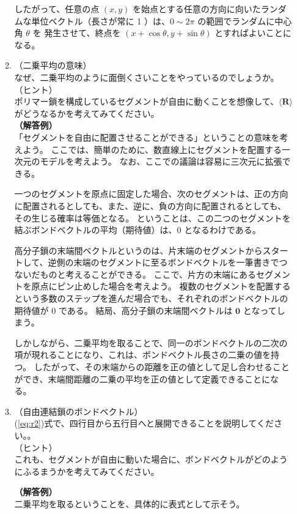 \documentclass[11pt]{jsarticle}
\begin{document}
\begin{itemize}
\begin{enumerate}
	したがって、任意の点 $(x,y)$ を始点とする任意の方向に向いたランダムな単位ベクトル（長さが常に 1 ）は、$0 \sim 2\pi$ の範囲でランダムに中心角 $\theta$ を
	発生させて、終点を $(x+\cos \theta, y+\sin \theta)$ とすればよいことになる。


	\item
	（二乗平均の意味）\\
	なぜ、二乗平均のように面倒くさいことをやっているのでしょうか。\\
	（ヒント）\\
	ポリマー鎖を構成しているセグメントが自由に動くことを想像して、$\langle \bm{R} \rangle$ がどうなるかを考えてみてください。\\
	{\bf（解答例）}\\
	「セグメントを自由に配置させることができる」ということの意味を考えよう。
	ここでは、簡単のために、数直線上にセグメントを配置する一次元のモデルを考えよう。
	なお、ここでの議論は容易に三次元に拡張できる。

	一つのセグメントを原点に固定した場合、次のセグメントは、正の方向に配置されるとしても、また、逆に、負の方向に配置されるとしても、その生じる確率は等価となる。
	ということは、この二つのセグメントを結ぶボンドベクトルの平均（期待値）は、0 となるわけである。

	高分子鎖の末端間ベクトルというのは、片末端のセグメントからスタートして、逆側の末端のセグメントに至るボンドベクトルを一筆書きでつないだものと考えることができる。
	ここで、片方の末端にあるセグメントを原点にピン止めした場合を考えよう。
	複数のセグメントを配置するという多数のステップを進んだ場合でも、それぞれのボンドベクトルの期待値が 0 である。
	結局、高分子鎖の末端間ベクトルは ${\bm 0}$ となってしまう。

	しかしながら、二乗平均を取ることで、同一のボンドベクトルの二次の項が現れることになり、これは、ボンドベクトル長さの二乗の値を持つ。
	したがって、その末端からの距離を正の値として足し合わせることができ、末端間距離の二乗の平均を正の値として定義できることになる。

	\item
	（自由連結鎖のボンドベクトル）\\
	(\ref{eq:r2})式で、四行目から五行目へと展開できることを説明してください。。\\
	（ヒント）\\
	これも、セグメントが自由に動いた場合に、ボンドベクトルがどのようにふるまうかを考えてみてください。

	{\bf（解答例）}\\
	二乗平均を取るということを、具体的に表式として示そう。


\end{enumerate}
\end{itemize}
\end{document}
